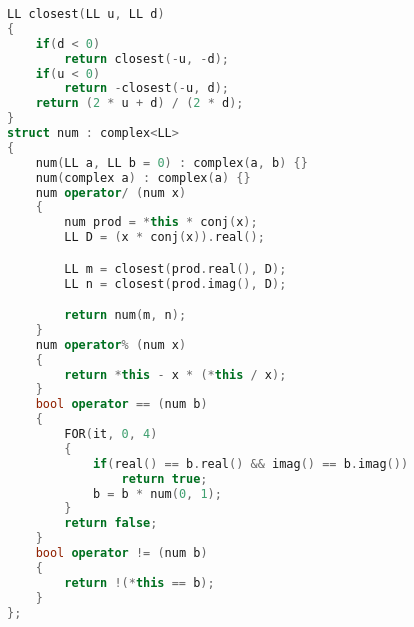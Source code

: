 \begin{lstlisting}[caption={gaussian-integer.hpp}, language=C++]
LL closest(LL u, LL d)
{
	if(d < 0)
		return closest(-u, -d);
	if(u < 0)
		return -closest(-u, d);
	return (2 * u + d) / (2 * d);
}
struct num : complex<LL>
{
	num(LL a, LL b = 0) : complex(a, b) {}
	num(complex a) : complex(a) {}
	num operator/ (num x)
	{
		num prod = *this * conj(x);
		LL D = (x * conj(x)).real();

		LL m = closest(prod.real(), D);
		LL n = closest(prod.imag(), D);

		return num(m, n);
	}
	num operator% (num x)
	{
		return *this - x * (*this / x);
	}
	bool operator == (num b)
	{
		FOR(it, 0, 4)
		{
			if(real() == b.real() && imag() == b.imag())
				return true;
			b = b * num(0, 1);
		}
		return false;
	}
	bool operator != (num b)
	{
		return !(*this == b);
	}
};
\end{lstlisting}
